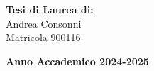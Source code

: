 \begin{titlepage}
    \begin{flushright}
        {\large \textbf{Tesi di Laurea di:}} \\
        \large{ Andrea Consonni } \\
        \large{ Matricola 900116 } 
    \end{flushright}
    
    \vspace{20mm}
    \begin{center}
        {\large{\bf Anno Accademico 2024-2025}}
    \end{center}

    
\end{titlepage}

